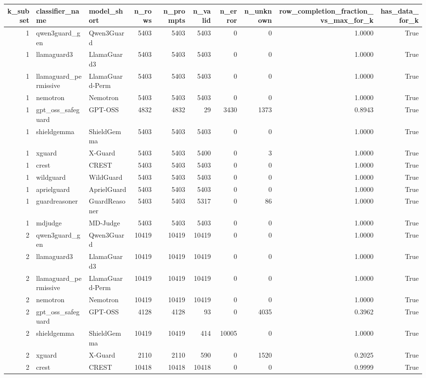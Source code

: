 \begin{tabular}{rllrrrrrrr}
\toprule
k\_subset & classifier\_name & model\_short & n\_rows & n\_prompts & n\_valid & n\_error & n\_unknown & row\_completion\_fraction\_vs\_max\_for\_k & has\_data\_for\_k \\
\midrule
1 & qwen3guard\_gen & Qwen3Guard & 5403 & 5403 & 5403 & 0 & 0 & 1.0000 & True \\
1 & llamaguard3 & LlamaGuard3 & 5403 & 5403 & 5403 & 0 & 0 & 1.0000 & True \\
1 & llamaguard\_permissive & LlamaGuard-Perm & 5403 & 5403 & 5403 & 0 & 0 & 1.0000 & True \\
1 & nemotron & Nemotron & 5403 & 5403 & 5403 & 0 & 0 & 1.0000 & True \\
1 & gpt\_oss\_safeguard & GPT-OSS & 4832 & 4832 & 29 & 3430 & 1373 & 0.8943 & True \\
1 & shieldgemma & ShieldGemma & 5403 & 5403 & 5403 & 0 & 0 & 1.0000 & True \\
1 & xguard & X-Guard & 5403 & 5403 & 5400 & 0 & 3 & 1.0000 & True \\
1 & crest & CREST & 5403 & 5403 & 5403 & 0 & 0 & 1.0000 & True \\
1 & wildguard & WildGuard & 5403 & 5403 & 5403 & 0 & 0 & 1.0000 & True \\
1 & aprielguard & AprielGuard & 5403 & 5403 & 5403 & 0 & 0 & 1.0000 & True \\
1 & guardreasoner & GuardReasoner & 5403 & 5403 & 5317 & 0 & 86 & 1.0000 & True \\
1 & mdjudge & MD-Judge & 5403 & 5403 & 5403 & 0 & 0 & 1.0000 & True \\
2 & qwen3guard\_gen & Qwen3Guard & 10419 & 10419 & 10419 & 0 & 0 & 1.0000 & True \\
2 & llamaguard3 & LlamaGuard3 & 10419 & 10419 & 10419 & 0 & 0 & 1.0000 & True \\
2 & llamaguard\_permissive & LlamaGuard-Perm & 10419 & 10419 & 10419 & 0 & 0 & 1.0000 & True \\
2 & nemotron & Nemotron & 10419 & 10419 & 10419 & 0 & 0 & 1.0000 & True \\
2 & gpt\_oss\_safeguard & GPT-OSS & 4128 & 4128 & 93 & 0 & 4035 & 0.3962 & True \\
2 & shieldgemma & ShieldGemma & 10419 & 10419 & 414 & 10005 & 0 & 1.0000 & True \\
2 & xguard & X-Guard & 2110 & 2110 & 590 & 0 & 1520 & 0.2025 & True \\
2 & crest & CREST & 10418 & 10418 & 10418 & 0 & 0 & 0.9999 & True \\

\end{tabular}
